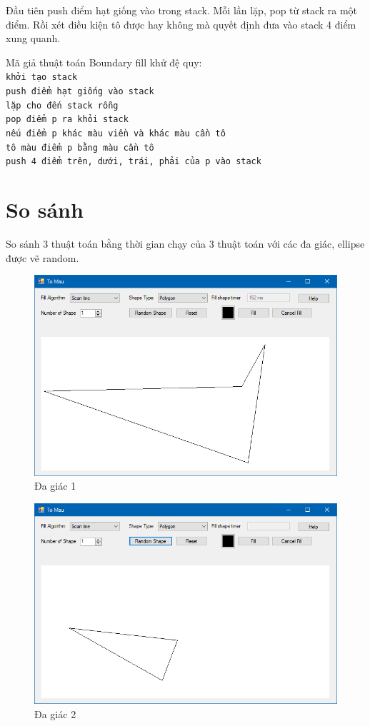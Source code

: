 \documentclass[12pt]{article}
\begin{document}
Đầu tiên push điểm hạt giống vào trong stack.
Mỗi lần lặp, pop từ stack ra một điểm.
Rồi xét điều kiện tô được hay không mà quyết định đưa vào stack 4 điểm xung quanh.

Mã giả thuật toán Boundary fill khử đệ quy: \\
\texttt{khởi tạo stack} \\
\texttt{push điểm hạt giống vào stack} \\
\texttt{lặp cho đến stack rỗng} \\
\texttt{\indent pop điểm p ra khỏi stack} \\
\texttt{\indent nếu điểm p khác màu viền và khác màu cần tô} \\
\texttt{\indent\indent tô màu điểm p bằng màu cần tô} \\
\texttt{\indent\indent push 4 điểm trên, dưới, trái, phải của p vào stack}

\section{So sánh}
So sánh 3 thuật toán bằng thời gian chạy của 3 thuật toán với các đa giác, ellipse được vẽ random.

\begin{figure}[H]
\centering
\includegraphics[width=\textwidth]{images/hinh1.png}
\caption{Đa giác 1}
\end{figure}

\begin{figure}[H]
\centering
\includegraphics[width=\textwidth]{images/hinh2.png}
\caption{Đa giác 2}
\end{figure}
\end{document}
